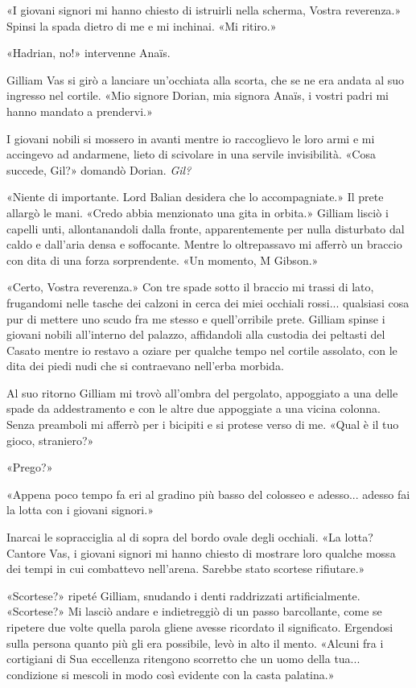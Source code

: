 «I giovani signori mi hanno chiesto di istruirli nella scherma, Vostra
reverenza.» Spinsi la spada dietro di me e mi inchinai. «Mi ritiro.»

«Hadrian, no!» intervenne Anaïs.

Gilliam Vas si girò a lanciare un'occhiata alla scorta, che se ne era
andata al suo ingresso nel cortile. «Mio signore Dorian, mia signora
Anaïs, i vostri padri mi hanno mandato a prendervi.»

I giovani nobili si mossero in avanti mentre io raccoglievo le loro armi
e mi accingevo ad andarmene, lieto di scivolare in una servile
invisibilità. «Cosa succede, Gil?» domandò Dorian. \emph{Gil?}

«Niente di importante. Lord Balian desidera che lo accompagniate.» Il
prete allargò le mani. «Credo abbia menzionato una gita in orbita.»
Gilliam lisciò i capelli unti, allontanandoli dalla fronte,
apparentemente per nulla disturbato dal caldo e dall'aria densa e
soffocante. Mentre lo oltrepassavo mi afferrò un braccio con dita di una
forza sorprendente. «Un momento, M Gibson.»

«Certo, Vostra reverenza.» Con tre spade sotto il braccio mi trassi di
lato, frugandomi nelle tasche dei calzoni in cerca dei miei occhiali
rossi... qualsiasi cosa pur di mettere uno scudo fra me stesso e
quell'orribile prete. Gilliam spinse i giovani nobili all'interno del
palazzo, affidandoli alla custodia dei peltasti del Casato mentre io
restavo a oziare per qualche tempo nel cortile assolato, con le dita dei
piedi nudi che si contraevano nell'erba morbida.

Al suo ritorno Gilliam mi trovò all'ombra del pergolato, appoggiato a
una delle spade da addestramento e con le altre due appoggiate a una
vicina colonna. Senza preamboli mi afferrò per i bicipiti e si protese
verso di me. «Qual è il tuo gioco, straniero?»

«Prego?»

«Appena poco tempo fa eri al gradino più basso del colosseo e adesso...
adesso fai la lotta con i giovani signori.»

Inarcai le sopracciglia al di sopra del bordo ovale degli occhiali. «La
lotta? Cantore Vas, i giovani signori mi hanno chiesto di mostrare loro
qualche mossa dei tempi in cui combattevo nell'arena. Sarebbe stato
scortese rifiutare.»

«Scortese?» ripeté Gilliam, snudando i denti raddrizzati
artificialmente. «Scortese?» Mi lasciò andare e indietreggiò di un passo
barcollante, come se ripetere due volte quella parola gliene avesse
ricordato il significato. Ergendosi sulla persona quanto più gli era
possibile, levò in alto il mento. «Alcuni fra i cortigiani di Sua
eccellenza ritengono scorretto che un uomo della tua... condizione si
mescoli in modo così evidente con la casta palatina.»


